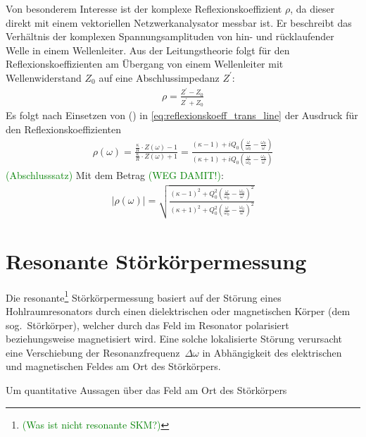 \documentclass[11pt, a4paper]{scrbook}
\newcommand{\todo}[1]{{\textcolor{Green}{(#1)}}}
\begin{document}
	Von besonderem Interesse ist der komplexe Reflexionskoeffizient $\rho$, da dieser direkt mit einem vektoriellen Netzwerkanalysator messbar ist.
	Er beschreibt das Verhältnis der komplexen Spannungsamplituden von hin- und rücklaufender Welle in einem Wellenleiter.
	Aus der Leitungstheorie \cite{pozar} folgt für den Reflexionskoeffizienten am Übergang von einem Wellenleiter mit Wellenwiderstand $Z_0$ auf eine Abschlussimpedanz $Z^\prime$:
	\begin{align}
		\rho = \frac{Z^\prime - Z_0}{Z^\prime + Z_0}
		\label{eq:reflexionskoeff_trans_line}
	\end{align}
	Es folgt nach Einsetzen von () in \eqref{eq:reflexionskoeff_trans_line} der Ausdruck für den Reflexionskoeffizienten 
	\begin{align}
		\rho(\omega) = \frac{\frac{\kappa}{R} \cdot Z(\omega) - 1}{\frac{\kappa}{R} \cdot Z(\omega) + 1} = \frac{(\kappa - 1) + i  Q_0 \left( \frac{\omega}{\omega_0}  - \frac{\omega_0}{\omega}\right)}{\left( \kappa + 1 \right) + i  Q_0 \left( \frac{\omega}{\omega_0}  - \frac{\omega_0}{\omega}\right)}
	\end{align}
	\todo{Abschlusssatz}
	Mit dem Betrag \todo{WEG DAMIT!}:
	\begin{align}
		| \rho(\omega) | = \sqrt{\frac{(\kappa - 1)^2 + Q_0^2 \left( \frac{\omega}{\omega_0}  - \frac{\omega_0}{\omega}\right)^2}{(\kappa + 1)^2 + Q_0^2 \left( \frac{\omega}{\omega_0}  - \frac{\omega_0}{\omega}\right)^2}}
	\end{align}

	\section{Resonante Störkörpermessung}
	Die resonante\footnote{\todo{Was ist nicht resonante SKM?}} Störkörpermessung basiert auf der Störung eines Hohlraumresonators durch einen dielektrischen oder magnetischen Körper (dem sog.\ Störkörper), welcher durch das Feld im Resonator polarisiert beziehungsweise magnetisiert wird.
	Eine solche lokalisierte Störung verursacht eine Verschiebung der Resonanzfrequenz~$\Delta \omega$ in Abhängigkeit des elektrischen und magnetischen Feldes am Ort des Störkörpers.
	
	Um quantitative Aussagen über das Feld am Ort des  Störkörpers
	
\end{document}

